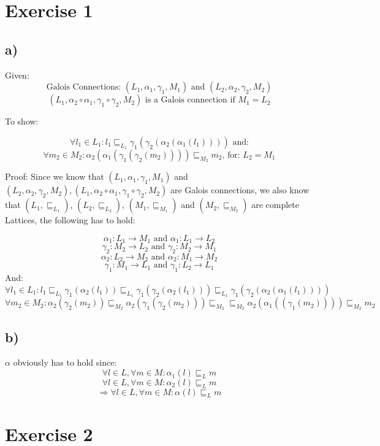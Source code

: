 \documentclass[fleqn,12pt]{article}
\begin{document}
\section*{Exercise 1}
\subsection*{a)}
Given:
$$\text{Galois Connections: } (L_1, \alpha_1, \gamma_1, M_1) \text{ and } (L_2, \alpha_2, \gamma_2, M_2)$$
$$(L_1, \alpha_2 \circ \alpha_1, \gamma_1 \circ \gamma_2,  M_2) \text{ is a Galois connection if } M_1 = L_2$$

To show:

$$\forall l_1 \in L_1: l_1 \sqsubseteq_{L_1} \gamma_1(\gamma_2(\alpha_2(\alpha_1(l_1)))) \text{ and:}$$
$$\forall m_2 \in M_2: \alpha_2(\alpha_1(\gamma_1(\gamma_2(m_2))))  \sqsubseteq_{M_2} m_2 \text{, for: } L_2 = M_1$$

Proof:
Since we know that $(L_1, \alpha_1, \gamma_1, M_1)$ and $(L_2, \alpha_2, \gamma_2, M_2), 
(L_1, \alpha_2 \circ \alpha_1, \gamma_1 \circ \gamma_2,  M_2)$ are Galois connections, we also know that $(L_1, \sqsubseteq_{L_1})$, $(L_2, \sqsubseteq_{L_2})$, $(M_1, \sqsubseteq_{M_1})$ and $(M_2, \sqsubseteq_{M_2})$ are complete Lattices, the following has to hold:

$$\alpha_1:L_1 \rightarrow M_1 \text{ and } \alpha_1:L_1 \rightarrow L_2$$
$$\gamma_2:M_2 \rightarrow L_2 \text{ and } \gamma_2:M_2 \rightarrow M_1$$
$$\alpha_2:L_2 \rightarrow M_2 \text{ and } \alpha_2:M_1 \rightarrow M_2$$
$$\gamma_1:M_1 \rightarrow L_1 \text{ and } \gamma_1:L_2 \rightarrow L_1$$
And:
$$\forall l_1 \in L_1:l_1\sqsubseteq_{L_1} \gamma_1(\alpha_2(l_1)) \sqsubseteq_{L_1} \gamma_1(\gamma_2(\alpha_2(l_1))) \sqsubseteq_{L_1} \gamma_1(\gamma_2(\alpha_2(\alpha_1(l_1))))$$
$$\forall m_2 \in M_2:\alpha_2(\gamma_2(m_2))\sqsubseteq_{M_2} \alpha_2(\gamma_1(\gamma_2(m_2)))\sqsubseteq_{M_2} \sqsubseteq_{M_2} \alpha_2(\alpha_1((\gamma_1(m_2))))\sqsubseteq_{M_2} m_2$$

\subsection*{b)}

$\alpha$ obviously has to hold since:
$$\forall l \in L,\forall m \in M: \alpha_1(l) \sqsubseteq_{L} m$$
$$\forall l \in L,\forall m \in M: \alpha_2(l) \sqsubseteq_{L} m$$
$$\Rightarrow \forall l \in L,\forall m \in M: \alpha(l) \sqsubseteq_{L} m$$
\section*{Exercise 2}
\end{document}

